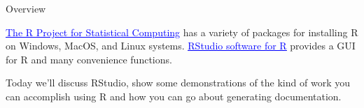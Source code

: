 \documentclass{beamer}
\begin{document}
\begin{frame}{
	\begin{minipage}[t]{0.75\textwidth}
		Overview
	\end{minipage}
	\hfill
	\begin{minipage}[t]{0.25\textwidth}
		\flushright
	\end{minipage}
}{}
\href{https://www.r-project.org/}{\textcolor{blue}{\underline{The R Project for Statistical Computing}}} has a variety of packages for installing R on Windows, MacOS, and Linux systems. \href{https://www.rstudio.com/}{\textcolor{blue}{\underline{RStudio software for R}}} provides a GUI for R and many convenience functions.

\vspace{0.2cm}
Today we'll discuss RStudio, show some demonstrations of the kind of work you can accomplish using R and how you can go about generating documentation. 

\end{frame}
\end{document}
